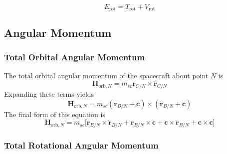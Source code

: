 \begin{equation}
E_{\text{rot}} = T_{\text{rot}} + V_{\text{rot}}
\end{equation}

\subsection{Angular Momentum}

\subsubsection{Total Orbital Angular Momentum}

The total orbital angular momentum of the spacecraft about point $N$ is
\begin{equation}
\bm H_{\text{orb},N} = m_{sc} \bm r_{C/N} \times \dot{\bm r}_{C/N}
\end{equation}
Expanding these terms yields
\begin{equation}
\bm H_{\text{orb},N} = m_{sc} (\bm r_{B/N} + \bm c) \times (\dot{\bm r}_{B/N} + \dot{\bm c})
\end{equation}
The final form of this equation is
\begin{equation}
\bm H_{\text{orb},N} = m_{sc} \Big[\bm r_{B/N} \times \dot{\bm r}_{B/N} + \bm r_{B/N} \times \dot{\bm c} + \bm c \times \dot{\bm r}_{B/N} + \bm c \times \dot{\bm c}\Big]
\end{equation}

\subsubsection{Total Rotational Angular Momentum}

